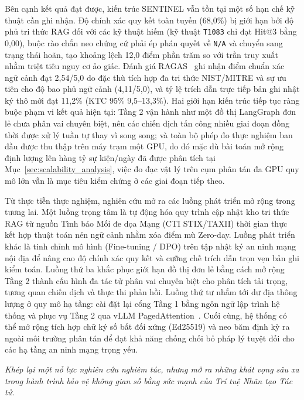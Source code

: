 Bên cạnh kết quả đạt được, kiến trúc SENTINEL vẫn tồn tại một số hạn chế kỹ thuật cần ghi nhận. Độ chính xác quy kết toàn tuyến (68,0\%) bị giới hạn bởi độ phủ tri thức RAG đối với các kỹ thuật hiếm (kỹ thuật \texttt{T1083} chỉ đạt Hit@3 bằng 0,00), buộc rào chắn neo chứng cứ phải ép phán quyết về \texttt{N/A} và chuyển sang trạng thái hoãn, tạo khoảng lệch 12,0 điểm phần trăm so với trần truy xuất nhằm triệt tiêu nguy cơ ảo giác. Đánh giá RAGAS~\cite{ragas2023} ghi nhận điểm chuẩn xác ngữ cảnh đạt 2,54/5,0 do đặc thù tích hợp đa tri thức NIST/MITRE và sự ưu tiên cho độ bao phủ ngữ cảnh (4,11/5,0), và tỷ lệ trích dẫn trực tiếp bản ghi nhật ký thô mới đạt 11,2\% (KTC 95\% 9,5--13,3\%). Hai giới hạn kiến trúc tiếp tục ràng buộc phạm vi kết quả hiện tại: Tầng 2 vận hành như một đồ thị LangGraph đơn lẻ chưa phân vai chuyên biệt, nên các chiến dịch tấn công nhiều giai đoạn đồng thời được xử lý tuần tự thay vì song song; và toàn bộ phép đo thực nghiệm ban đầu được thu thập trên máy trạm một GPU, do đó mặc dù bài toán mở rộng định lượng lên hàng tỷ sự kiện/ngày đã được phân tích tại Mục~\ref{sec:scalability_analysis}, việc đo đạc vật lý trên cụm phân tán đa GPU quy mô lớn vẫn là mục tiêu kiểm chứng ở các giai đoạn tiếp theo.

Từ thực tiễn thực nghiệm, nghiên cứu mở ra các luồng phát triển mở rộng trong tương lai. Một luồng trọng tâm là tự động hóa quy trình cập nhật kho tri thức RAG từ nguồn Tình báo Mối đe dọa Mạng (CTI STIX/TAXII) thời gian thực kết hợp thuật toán nén ngữ cảnh nhằm xóa điểm mù Zero-day. Luồng phát triển khác là tinh chỉnh mô hình (Fine-tuning / DPO) trên tập nhật ký an ninh mạng nội địa để nâng cao độ chính xác quy kết và cưỡng chế trích dẫn trọn vẹn bản ghi kiểm toán. Luồng thứ ba khắc phục giới hạn đồ thị đơn lẻ bằng cách mở rộng Tầng 2 thành cấu hình đa tác tử phân vai chuyên biệt cho phân tích tải trọng, tương quan chiến dịch và thực thi phản hồi. Luồng thứ tư nhắm tới dư địa thông lượng ở quy mô hạ tầng: cài đặt lại cổng Tầng 1 bằng ngôn ngữ lập trình hệ thống và phục vụ Tầng 2 qua vLLM PagedAttention~\cite{kwon2023vllm}. Cuối cùng, hệ thống có thể mở rộng tích hợp chữ ký số bất đối xứng (Ed25519) và neo băm định kỳ ra ngoài môi trường phân tán để đạt khả năng chống chối bỏ pháp lý tuyệt đối cho các hạ tầng an ninh mạng trọng yếu.

\vspace{0.3cm}
\begin{flushright}
    \textit{Khép lại một nỗ lực nghiên cứu nghiêm túc, nhưng mở ra những khát vọng sâu xa trong hành trình bảo vệ không gian số bằng sức mạnh của Trí tuệ Nhân tạo Tác tử.}
\end{flushright}
